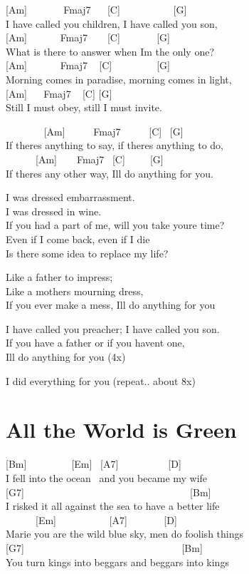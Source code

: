 \documentclass[
  letterpaper,
  twoside=false]{scrbook}
\begin{document}
{[}Am{]} ~ ~ ~ ~ Fmaj7 ~ ~{[}C{]} ~ ~ ~ ~ ~ ~ {[}G{]}\\
I have called you children, I have called you son,\\
{[}Am{]} ~ ~ ~ ~Fmaj7 ~ ~ {[}C{]} ~ ~ ~ ~ {[}G{]}\\
What is there to answer when I\textquotesingle m the only one?\\
{[}Am{]} ~ ~ ~ ~Fmaj7 ~ {[}C{]} ~ ~ ~ ~ ~ {[}G{]}\\
Morning comes in paradise, morning comes in light,\\
{[}Am{]} ~ ~Fmaj7 ~ {[}C{]} {[}G{]}\\
Still I must obey, still I must invite.

~ ~ ~ ~ ~{[}Am{]} ~ ~ ~ Fmaj7 ~ ~ ~ {[}C{]} ~{[}G{]}\\
If there\textquotesingle s anything to say, if there\textquotesingle s
anything to do,\\
\hspace*{0.333em} ~ ~ ~ ~{[}Am{]} ~ ~ Fmaj7 ~{[}C{]} ~ ~ ~{[}G{]}\\
If there\textquotesingle s any other way, I\textquotesingle ll do
anything for you.

I was dressed embarrassment.\\
I was dressed in wine.\\
If you had a part of me, will you take you\textquotesingle re time?\\
Even if I come back, even if I die\\
Is there some idea to replace my life?

Like a father to impress;\\
Like a mother\textquotesingle s mourning dress,\\
If you ever make a mess, I\textquotesingle ll do anything for you

I have called you preacher; I have called you son.\\
If you have a father or if you haven\textquotesingle t one,\\
I\textquotesingle ll do anything for you (4x)

I did everything for you (repeat.. about 8x)

\hypertarget{all-the-world-is-green}{%
\chapter{All the World is Green}\label{all-the-world-is-green}}

{[}Bm{]} ~ ~ ~ ~ ~ {[}Em{]} ~{[}A7{]} ~ ~ ~ ~ ~ ~{[}D{]}\\
I fell into the ocean ~and you became my wife\\
{[}G7{]} ~ ~ ~ ~ ~ ~ ~ ~ ~ ~ ~ ~ ~ ~ ~ ~ ~ ~ ~ ~{[}Bm{]}\\
I risked it all against the sea to have a better life\\
\hspace*{0.333em} ~ ~ ~ ~{[}Em{]} ~ ~ ~ ~ ~ ~ {[}A7{]} ~ ~ ~ ~ {[}D{]}\\
Marie you are the wild blue sky, men do foolish things\\
{[}G7{]} ~ ~ ~ ~ ~ ~ ~ ~ ~ ~ ~ ~ ~ ~ ~ ~ ~ ~ ~{[}Bm{]}\\
You turn kings into beggars and beggars into kings
\end{document}
